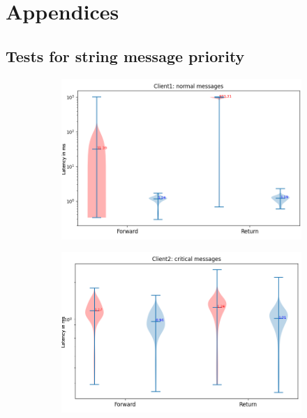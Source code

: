 \chapter{Appendices}\label{chap: append}
\section{Tests for string message priority}\label{chap: append-string-priority}
%
\begin{figure}[h]
    \centering
    \begin{subfigure}[b]{0.79\textwidth}
    \centering
    \includegraphics[width=\textwidth]{figures/appendix/priority_tests/log_violin_2clients_string_priority_client1.png}\hfill 
    \caption{} \label{fig: priority-2clients-string-1}
    \end{subfigure}
    \begin{subfigure}[b]{0.79\textwidth}
        \centering
        \includegraphics[width=\textwidth]{figures/appendix/priority_tests/log_violin_2clients_string_priority_client2.png}\hfill 
        \caption{} \label{fig: priority-2clients-string-2}
    \end{subfigure}
    

\end{figure}
